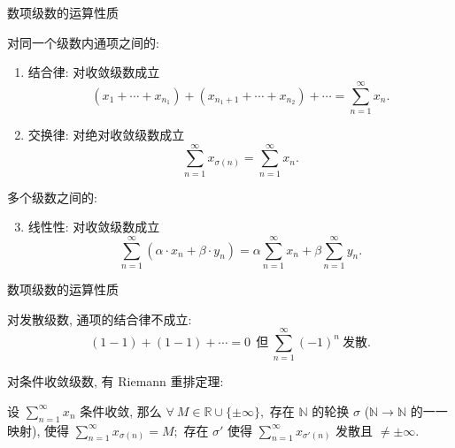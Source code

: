 
\begin{frame}{数项级数的运算性质}

对同一个级数内通项之间的:
\pause
\begin{enumerate}
\item 结合律: 对收敛级数成立
\[(x_1 + \cdots + x_{n_1}) + (x_{n_1+1} + \cdots + x_{n_2}) + \cdots = \sum\limits_{n=1}^\infty x_n.\]
\pause
\item 交换律: 对绝对收敛级数成立
\[\sum\limits_{n=1}^\infty x_{\sigma(n)} = \sum\limits_{n=1}^\infty x_n.\]
\end{enumerate}

\pause

多个级数之间的:
\pause
\begin{enumerate}[<+->]
\setcounter{enumi}{2}
\item 线性性: 对收敛级数成立
\[\sum\limits_{n=1}^\infty \left( \alpha \cdot x_n + \beta \cdot y_n \right) = \alpha \sum\limits_{n=1}^\infty x_n + \beta \sum\limits_{n=1}^\infty y_n.\]
\end{enumerate}

\end{frame}


\begin{frame}{数项级数的运算性质}

对发散级数, 通项的结合律不成立:
\[(1 - 1) + (1 - 1) + \cdots = 0 ~~ \text{但} ~ \sum\limits_{n=1}^{\infty} (-1)^n ~ \text{发散.}\]

\pause
\vspace{1em}

对条件收敛级数, 有 Riemann 重排定理:
\begin{thm}
设 $\sum\limits_{n=1}^{\infty} x_n$ 条件收敛, 那么 $\forall~M \in \mathbb{R} \cup \{ \pm \infty \},$ 存在 $\mathbb{N}$ 的轮换 $\sigma$ ($\mathbb{N} \to \mathbb{N}$ 的一一映射), 使得 $\sum\limits_{n=1}^{\infty} x_{\sigma(n)} = M;$ 存在 $\sigma'$ 使得 $\sum\limits_{n=1}^{\infty} x_{\sigma'(n)}$ 发散且 $\neq \pm\infty.$
\end{thm}

\end{frame}


